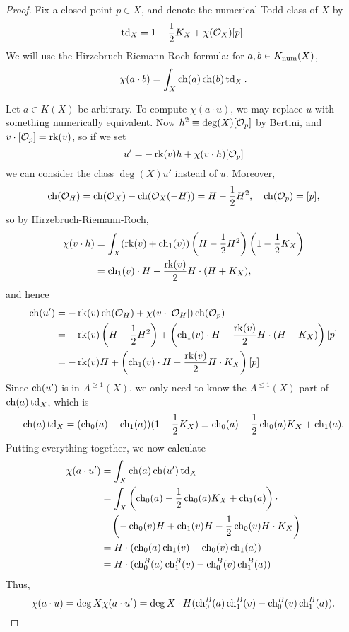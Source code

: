 \documentclass[letterpaper,11pt]{amsart}%
\theoremstyle{remark}
\begin{document}
\begin{proof}
    Fix a closed point $p \in X$, and denote the numerical Todd class of $X$ by
    \[ \td_X = 1 - \frac{1}{2} K_X + \chi(\Oh_X) [p]. \]
    We will use the Hirzebruch-Riemann-Roch formula: for $a, b \in \Kn(X)$,
    \[ \chi(a \cdot b) = \int_X \ch(a) \ch(b) \td_X. \]
    
    Let $a \in K(X)$ be arbitrary. To compute $\chi(a \cdot u)$, we may replace $u$ with something numerically equivalent. Now $h^2 \equiv \deg(X) [\Oh_p]$ by Bertini, and $v \cdot [\Oh_p] = \rk(v)$, so if we set
    \[ u' = - \rk(v) h + \chi(v \cdot h) [\Oh_p] \]
    we can consider the class $\deg(X) u'$ instead of $u$. Moreover, 
    \[ \ch(\Oh_H) = \ch(\Oh_X) - \ch(\Oh_X(-H)) = H - \frac{1}{2} H^2, \quad \ch(\Oh_p) = [p], \]
    so by Hirzebruch-Riemann-Roch,
    \begin{align*}
        \chi(v \cdot h) & = \int_X (\rk(v) + \ch_1(v))\left(H - \frac{1}{2}H^2\right)\left(1 - \frac{1}{2}K_X\right) \\
        & = \ch_1(v) \cdot H - \frac{\rk(v)}{2} H\cdot(H + K_X),
    \end{align*}
    and hence
    \begin{align*}
        \ch(u') & = -\rk(v) \ch(\Oh_H) + \chi(v \cdot [\Oh_H]) \ch(\Oh_p) \\
        & = -\rk(v)\left(H - \frac{1}{2}H^2\right) + \left(\ch_1(v) \cdot H - \frac{\rk(v)}{2} H\cdot (H + K_X)\right)[p] \\
        & = -\rk(v) H + \left(\ch_1(v) \cdot H - \frac{\rk(v)}{2} H \cdot K_X\right)[p]
    \end{align*}
    Since $\ch(u')$ is in $A^{\ge 1}(X)$, we only need to know the $A^{\le 1}(X)$-part of $\ch(a)\td_X$, which is
    \[ \ch(a) \td_X = (\ch_0(a) + \ch_1(a)) (1 - \frac{1}{2} K_X) \equiv \ch_0(a) - \frac{1}{2} \ch_0(a) K_X + \ch_1(a). \]
    Putting everything together, we now calculate
    \begin{align*}
        \chi(a \cdot u') & = \int_X \ch(a) \ch(u') \td_X \\
        & = \int_X \left(\ch_0(a) - \frac{1}{2} \ch_0(a) K_X + \ch_1(a)\right)\cdot  \\
        & \quad\left(-\ch_0(v) H + \ch_1(v) H - \frac{1}{2} \ch_0(v) H \cdot K_X\right) \\
        & = H \cdot (\ch_0(a) \ch_1(v) - \ch_0(v) \ch_1(a)) \\
        & = H \cdot (\ch^B_0(a) \ch^B_1(v) - \ch^B_0(v) \ch^B_1(a))
    \end{align*}
    Thus,
    \[ \chi(a \cdot u) = \deg X \chi(a \cdot u') = \deg X \cdot H (\ch^B_0(a) \ch^B_1(v) - \ch^B_0(v) \ch^B_1(a)). \]
    

\end{proof}
\end{document}
